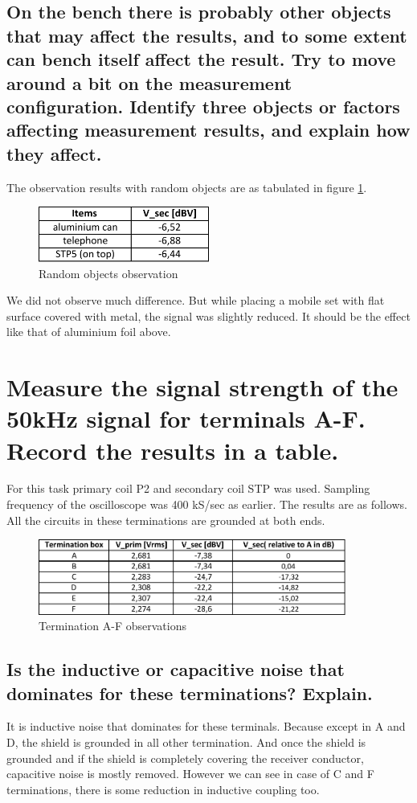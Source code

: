 \documentclass[12pt,a4paper,UKenglish]{article}
\begin{document}
\subsection{On the bench there is probably other objects that may affect the results, and to some extent can bench itself affect the result. Try to move around a bit on the measurement configuration. Identify three objects or factors affecting measurement results, and explain how they affect.}
The observation results with random objects are as tabulated in figure \ref{fig:task4b}.
\begin{figure} [H] %
  \centering 
  \includegraphics[width=0.5\textwidth]{img/task4b_data.pdf} 
  \caption{Random objects observation}
  \label{fig:task4b} 
\end{figure}
We did not observe much difference. But while placing a mobile set with flat surface covered with metal, the signal was slightly reduced. It should be the effect like that of aluminium foil above.

\section{Measure the signal strength of the 50kHz signal for terminals A-F. Record the results in a table.} 
For this task primary coil P2 and secondary coil STP was used. Sampling frequency of the oscilloscope was 400 kS/sec as earlier. The results are as follows. All the circuits in these terminations are grounded at both ends.
\begin{figure} [H] %
  \centering 
  \includegraphics[width=0.9\textwidth]{img/task5_data.pdf} 
  \caption{Termination A-F observations}
  \label{fig:task5b} 
\end{figure}
\subsection{Is the inductive or capacitive noise that dominates for these terminations? Explain.}
It is inductive noise that dominates for these terminals. Because except in A and D, the shield is grounded in all other termination. And once the shield is grounded and if the shield is completely covering the receiver conductor, capacitive noise is mostly removed. However we can see in case of C and F terminations, there is some reduction in inductive coupling too.
\end{document}
